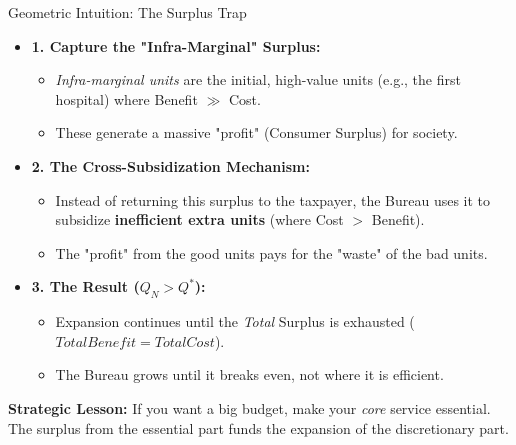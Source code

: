 \documentclass[10pt]{beamer}
\begin{document}
\begin{frame}{Geometric Intuition: The Surplus Trap}

\begin{itemize}
\item \textbf{1. Capture the "Infra-Marginal" Surplus:}
\begin{itemize}
\item \emph{Infra-marginal units} are the initial, high-value units (e.g., the first hospital) where Benefit $\gg$ Cost.
\item These generate a massive "profit" (Consumer Surplus) for society.
\end{itemize}

\item \textbf{2. The Cross-Subsidization Mechanism:}
\begin{itemize}
\item Instead of returning this surplus to the taxpayer, the Bureau uses it to subsidize \textbf{inefficient extra units} (where Cost $>$ Benefit).
\item The "profit" from the good units pays for the "waste" of the bad units.
\end{itemize}

\item \textbf{3. The Result ($Q_N > Q^*$):}
\begin{itemize}
\item Expansion continues until the \emph{Total} Surplus is exhausted ($Total Benefit = Total Cost$).
\item The Bureau grows until it breaks even, not where it is efficient.
\end{itemize}
\end{itemize}

\vspace{0.2cm}
\textbf{Strategic Lesson:} If you want a big budget, make your \emph{core} service essential. The surplus from the essential part funds the expansion of the discretionary part.
\end{frame}
\end{document}
